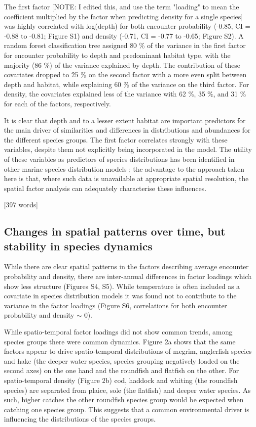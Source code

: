 \documentclass{nature}
\begin{document}
\begin{linenumbers}
The first factor [NOTE:  I edited this, and use the term "loading" to mean the coefficient multiplied by the factor when predicting density for a single species] was highly correlated with
log(depth) for both encounter probability (-0.85, CI = -0.88 to -0.81; Figure
S1) and density (-0.71, CI = -0.77 to -0.65; Figure S2). A random forest
classification tree assigned 80 \% of the variance in the first factor for
encounter probability to depth and predominant habitat type, with the majority
(86 \%) of the variance explained by depth. The contribution of these
covariates dropped to 25 \% on the second factor with a more even split between
depth and habitat, while explaining 60 \% of the variance on the third factor.
For density, the covariates explained less of the variance with 62 \%, 35 \%,
and 31 \% for each of the factors, respectively.

It is clear that depth and to a lesser extent habitat are important predictors
for the main driver of similarities and differences in distributions and
abundances for the different species groups. The first factor correlates
strongly with these variables, despite them not explicitly being incorporated
in the model. The utility of these variables as predictors of species
distributions has been identified in other marine species distribution models
\cite{Robinson2011}; the advantage to the approach taken here is that, where such
data is unavailable at appropriate spatial resolution, the spatial factor
analysis can adequately characterise these influences.

[397 words]

\subsection{Changes in spatial patterns over time, but stability in species
	dynamics}

While there are clear spatial patterns in the factors describing average
encounter probability and density, there are inter-annual differences in factor
loadings which show less structure (Figures S4, S5). While temperature is often
included as a covariate in species distribution models it was found not to
contribute to the variance in the factor loadings (Figure S6, correlations for
both encounter probability and density $\sim$ 0).

While spatio-temporal factor loadings did not show common trends, among species
groups there were common dynamics. Figure 2a shows that the same factors appear
to drive spatio-temporal distributions of megrim, anglerfish species and hake
(the deeper water species, species grouping negatively loaded on the second
axes) on the one hand and the roundfish and flatfish on the other. For
spatio-temporal density (Figure 2b) cod, haddock and whiting (the roundfish
species) are separated from plaice, sole (the flatfish) and deeper water
species. As such, higher catches the other roundfish species group would be
expected when catching one species group. This suggests that a common
environmental driver is influencing the distributions of the species groups.  


\end{linenumbers}
\end{document}
